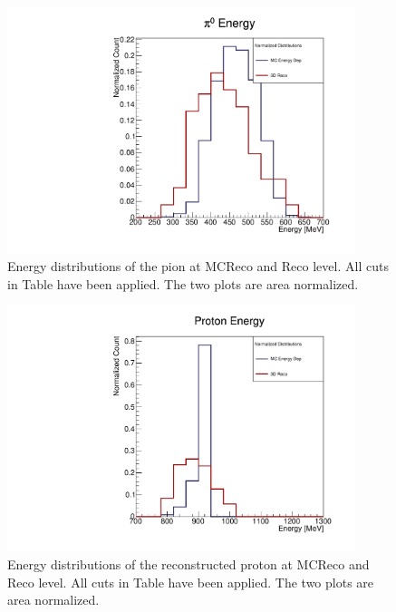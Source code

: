 \documentclass[a4paper, 10pt]{article}
\begin{document}
\begin{figure}[htb]
\begin{center}
\includegraphics[width=4in]{pPi0E/e_pion_postcutcomp.pdf}
\caption{Energy distributions of the pion at MCReco and Reco level. All cuts in Table \label{t3} have been applied. The two plots are area normalized.}
\label{f2}
\end{center}
\end{figure}

\begin{figure}[htbp]
\begin{center}
\includegraphics[width=4in]{pPi0E/e_proton_postcutcomp.pdf}
\caption{Energy distributions of the reconstructed proton at MCReco and Reco level. All cuts in Table \label{t3} have been applied. The two plots are area normalized.}
\label{f3}
\end{center}
\end{figure}



\end{document}
